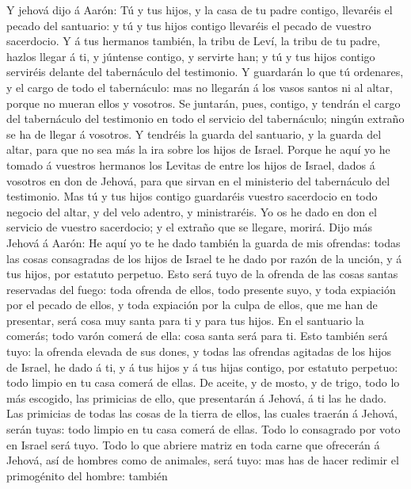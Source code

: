  Y jehová dijo á Aarón: Tú y tus hijos, y la casa de tu
padre contigo, llevaréis el pecado del santuario: y tú y tus hijos
contigo llevaréis el pecado de vuestro sacerdocio.  Y á tus
hermanos también, la tribu de Leví, la tribu de tu padre, hazlos llegar
á ti, y júntense contigo, y servirte han; y tú y tus hijos contigo
serviréis delante del tabernáculo del testimonio.  Y
guardarán lo que tú ordenares, y el cargo de todo el tabernáculo: mas no
llegarán á los vasos santos ni al altar, porque no mueran ellos y
vosotros.  Se juntarán, pues, contigo, y tendrán el cargo
del tabernáculo del testimonio en todo el servicio del tabernáculo;
ningún extraño se ha de llegar á vosotros.  Y tendréis la
guarda del santuario, y la guarda del altar, para que no sea más la ira
sobre los hijos de Israel.  Porque he aquí yo he tomado á
vuestros hermanos los Levitas de entre los hijos de Israel, dados á
vosotros en don de Jehová, para que sirvan en el ministerio del
tabernáculo del testimonio.  Mas tú y tus hijos contigo
guardaréis vuestro sacerdocio en todo negocio del altar, y del velo
adentro, y ministraréis. Yo os he dado en don el servicio de vuestro
sacerdocio; y el extraño que se llegare, morirá.  Dijo más
Jehová á Aarón: He aquí yo te he dado también la guarda de mis ofrendas:
todas las cosas consagradas de los hijos de Israel te he dado por razón
de la unción, y á tus hijos, por estatuto perpetuo.  Esto
será tuyo de la ofrenda de las cosas santas reservadas del fuego: toda
ofrenda de ellos, todo presente suyo, y toda expiación por el pecado de
ellos, y toda expiación por la culpa de ellos, que me han de presentar,
será cosa muy santa para ti y para tus hijos.  En el
santuario la comerás; todo varón comerá de ella: cosa santa será para
ti.  Esto también será tuyo: la ofrenda elevada de sus
dones, y todas las ofrendas agitadas de los hijos de Israel, he dado á
ti, y á tus hijos y á tus hijas contigo, por estatuto perpetuo: todo
limpio en tu casa comerá de ellas.  De aceite, y de mosto,
y de trigo, todo lo más escogido, las primicias de ello, que presentarán
á Jehová, á ti las he dado.  Las primicias de todas las
cosas de la tierra de ellos, las cuales traerán á Jehová, serán tuyas:
todo limpio en tu casa comerá de ellas.  Todo lo consagrado
por voto en Israel será tuyo.  Todo lo que abriere matriz
en toda carne que ofrecerán á Jehová, así de hombres como de animales,
será tuyo: mas has de hacer redimir el primogénito del hombre: también

